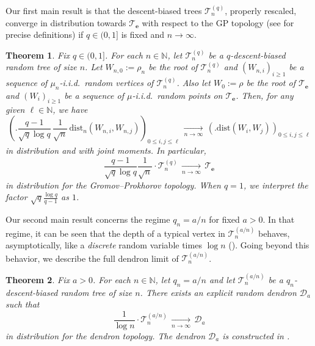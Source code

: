 \documentclass{article}
\newtheorem{theorem}{Theorem}[section]
\theoremstyle{remark}
\newcommand{\bN}{\mathbb{N}}
\newcommand{\cv}[1]{\,\underset{#1}{\longrightarrow}\,}
\newcommand{\dist}{\mathrm{dist}}
\newcommand{\cT}{\mathcal{T}}
\newcommand{\cD}{\mathcal{D}}
\newcommand{\be}{\mathbf{e}}
\begin{document}
Our first main result is that the descent-biased trees $\cT_n^{(q)}$, properly rescaled, converge in distribution towards $\cT_\be$ with respect to the GP topology (see  for precise definitions) if $q\in(0,1]$ is fixed and $n\to\infty$.

\begin{theorem}\label{th: CRT limit if q fixed}
    Fix $q\in(0,1]$.
    For each $n\in\bN$, let $\cT_n^{(q)}$ be a $q$-descent-biased random tree of size $n$.
    Let $W_{n,0} := \rho_n$ be the root of $\cT_n^{(q)}$ and $(W_{n,i})_{i\ge1}$ be a sequence of $\mu_n$-i.i.d.~random vertices of $\cT_n^{(q)}$.
    Also let $W_{0} := \rho$ be the root of $\cT_\be$ and $(W_{i})_{i\ge1}$ be a sequence of $\mu$-i.i.d.~random points on $\cT_\be$.
    Then, for any given $\ell\in\bN$, we have
    \begin{equation*}
        \left(\big. \frac{q-1}{\sqrt q \log q} \,\frac{1}{\sqrt n}
        \,\dist_n{\left( W_{n,i} , W_{n,j} \right)} \right)_{0\le i,j\le \ell}
        \cv{n\to\infty}
        \left(\big. \dist{\left( W_{i} , W_{j} \right)} \right)_{0\le i,j\le \ell}
    \end{equation*}
    in distribution and with joint moments.
    In particular,
    \begin{equation*}
        \frac{q-1}{\sqrt q \log q} \frac{1}{\sqrt n} \cdot \cT_n^{(q)}
        \cv{n\to\infty}
        \cT_\be
    \end{equation*}
    in distribution for the Gromov--Prokhorov topology.
    When $q=1$, we interpret the factor $\sqrt q \frac{\log q}{q-1}$ as $1$.
\end{theorem}

Our second main result concerns the regime $q_n = a/n$ for fixed $a>0$.
In that regime, it can be seen that the depth of a typical vertex in $\cT_n^{(a/n)}$ behaves, asymptotically, like a \emph{discrete} random variable times $\log n$ ().
Going beyond this behavior, we describe the full dendron limit of $\cT_n^{(a/n)}$.

\begin{theorem}\label{th: dendron limit if a/n}
    Fix $a>0$.
    For each $n\in\bN$, let $q_n=a/n$ and let $\cT_n^{(a/n)}$ be a $q_n$-descent-biased random tree of size $n$.
    There exists an explicit random dendron $\cD_a$ such that
    \begin{equation*}
        \frac{1}{\log n} \cdot \cT_n^{(a/n)}
        \cv{n\to\infty}
        \cD_a
    \end{equation*}
    in distribution for the dendron topology.
    The dendron $\cD_a$ is constructed in .
\end{theorem}
\end{document}
